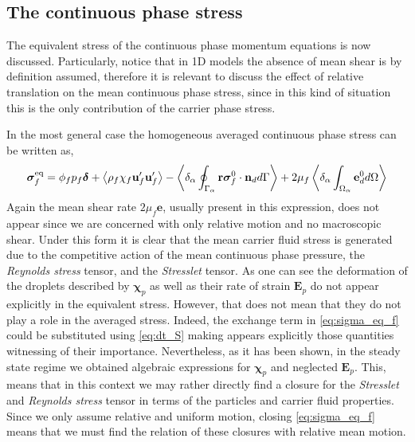

\subsection{The continuous phase stress}

The equivalent stress of the continuous phase momentum equations is now discussed. 
Particularly, notice that in 1D models the absence of mean shear is by definition assumed, therefore it is relevant to discuss the effect of relative translation on the mean continuous phase stress, since in this kind of situation this is the only contribution of the carrier phase stress. 

In the most general case the homogeneous averaged continuous phase stress can be written as, 
\begin{equation}
    \bm{\sigma}^\text{eq}_f = 
    \phi_f p_f \bm\delta 
    +\left<\rho_f\chi_f\textbf{u}_f'\textbf{u}_f'\right>
    - \left<\delta_\alpha \oint_{\Gamma_{\alpha}} \textbf{r}\bm{\sigma}_f^0\cdot \textbf{n}_d d\Gamma\right>
    + 2 \mu_f \left<\delta_\alpha \int_{\Omega_{\alpha}} \textbf{e}_d^0 d\Omega\right>
    \label{eq:sigma_eq_f}
\end{equation} 
Again the mean shear rate $2\mu_f\textbf{e}$, usually present in this expression, does not appear since we are concerned with only relative motion and no macroscopic shear. 
Under this form it is clear that the mean carrier fluid stress is generated due to the competitive action of the mean continuous phase pressure, the \textit{Reynolds stress} tensor, and the \textit{Stresslet} tensor. 
As one can see the deformation of the droplets described by $\bm\chi_p$ as well as their rate of strain $\textbf{E}_p$ do not appear explicitly in the equivalent stress. 
However, that does not mean that they do not play a role in the averaged stress. 
Indeed, the exchange term in \ref{eq:sigma_eq_f} could be substituted using \ref{eq:dt_S} making appears explicitly those quantities witnessing of their importance. 
Nevertheless, as it has been shown, in the steady state regime we obtained algebraic expressions for $\bm\chi_p$ and neglected $\textbf{E}_p$. 
This, means that in this context we may rather directly find a closure for the \textit{Stresslet} and \textit{Reynolds stress} tensor in terms of the particles and carrier fluid properties. 
Since we only assume relative and uniform motion, closing \ref{eq:sigma_eq_f} means that we must find the relation of these closures with relative mean motion.


